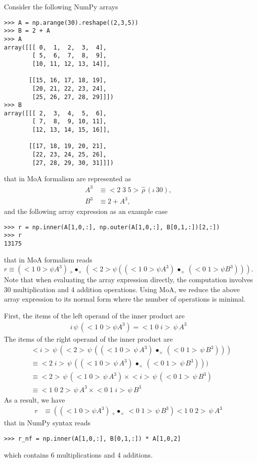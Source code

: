 \documentclass[a4paper,12pt]{article}
\newcommand{\reshape}{\,\widehat{\rho}\,}         %
\newcommand{\range}{\iota\,}                      %
\newcommand{\vc}[1]{<#1>}                         %
\newcommand{\vcc}[2]{<#1\;#2>}                    %
\newcommand{\vccc}[3]{<#1\;#2\;#3>}               %
\newcommand{\outerprod}[1]{\,\bullet_{#1}\,}              %
\newcommand{\innerprod}[2]{\,{}_{#1}\!\!\bullet_{#2}\,}   %
\newcommand{\getitem}[2]{{#2}\,\psi\,{#1}}        %
\begin{document}
Consider the following NumPy arrays
\begin{verbatim}
>>> A = np.arange(30).reshape((2,3,5))
>>> B = 2 + A
>>> A
array([[[ 0,  1,  2,  3,  4],
        [ 5,  6,  7,  8,  9],
        [10, 11, 12, 13, 14]],

       [[15, 16, 17, 18, 19],
        [20, 21, 22, 23, 24],
        [25, 26, 27, 28, 29]]])
>>> B
array([[[ 2,  3,  4,  5,  6],
        [ 7,  8,  9, 10, 11],
        [12, 13, 14, 15, 16]],

       [[17, 18, 19, 20, 21],
        [22, 23, 24, 25, 26],
        [27, 28, 29, 30, 31]]])
\end{verbatim}
that in MoA formalism are represented as
\begin{align}
  A^3 &\equiv \vccc235\reshape(\range30), \\
  B^3 &\equiv 2+A^3,
\end{align}
and the following array expression as an example case
\begin{verbatim}
>>> r = np.inner(A[1,0,:], np.outer(A[1,0,:], B[0,1,:])[2,:])
>>> r
13175
\end{verbatim}
that in MoA formalism reads
\begin{equation}
r \equiv (\vcc10\psi A^3) \innerprod+\times (\vc2\psi((\vcc10\psi A^3) \outerprod\times (\vcc01\psi B^3))).
\end{equation}
Note that when evaluating the array expression directly, the
computation involves 30 multiplication and 4 addition
operations. Using MoA, we reduce the above array expression to its
normal form where the number of operations is minimal.

First, the items of the left operand of the inner product are
\begin{align*}
  \getitem{(\vcc10\psi A^3)}i = \getitem{A^3}{\vccc10i}
\end{align*}
The items of the right operand of the inner product are
\begin{align}
&\getitem{
  (\getitem{((\getitem{A^3}{\vcc10}) \outerprod\times (\getitem{B^3}{\vcc01}))}{\vc2})
}{\vc i} \\
&\equiv \getitem{((\getitem{A^3}{\vcc10}) \outerprod\times (\getitem{B^3}{\vcc01})))}{\vcc2i} \\
&\equiv \getitem{(\getitem{A^3}{\vcc10})}{\vc2} \times \getitem{(\getitem{B^3}{\vcc01})}{\vc i}\\
&\equiv \getitem{A^3}{\vccc102} \times \getitem{B^3}{\vccc01i}
\end{align}
As a result, we have
\begin{align*}
  r &\equiv ((\vcc10\psi A^3) \innerprod+\times  \getitem{B^3}{\vcc01}) \getitem{A^3}{\vccc102}
\end{align*}
that in NumPy syntax reads
\begin{verbatim}
>>> r_nf = np.inner(A[1,0,:], B[0,1,:]) * A[1,0,2]
\end{verbatim}
which contains 6 multiplications and 4 additions.
\end{document}
